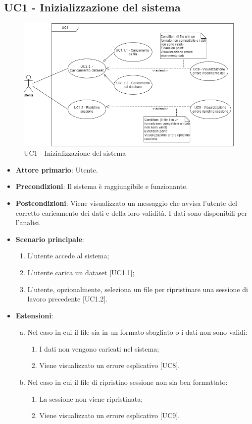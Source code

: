 \subsection{UC1 - Inizializzazione del sistema}
\begin{figure}[h]
\includegraphics[width=\linewidth]{section/Images/UC1.png}
\centering
\caption{UC1 - Inizializzazione del sistema}
\end{figure}
\begin{itemize}
	\item \textbf{Attore primario}: Utente.
	\item \textbf{Precondizioni}: Il sistema è raggiungibile e funzionante.
	\item \textbf{Postcondizioni}: Viene visualizzato un messaggio che avvisa l'utente del corretto caricamento dei dati e della loro validità. I dati sono disponibili per l'analisi.
	\item \textbf{Scenario principale}:
		\begin{enumerate}
			\item L'utente accede al sistema;
			\item L'utente carica un dataset [UC1.1];
			\item L'utente, opzionalmente, seleziona un file per ripristinare una sessione di lavoro precedente [UC1.2].
			
		\end{enumerate}
	\item \textbf{Estensioni}:
	\begin{enumerate}[(a)]
		\item Nel caso in cui il file sia in un formato sbagliato o i dati non sono validi:
		\begin{enumerate}[1.]
			\item I dati non vengono caricati nel sistema;
			\item Viene visualizzato un errore esplicativo [UC8].
		\end{enumerate}
		
		\item Nel caso in cui il file di ripristino sessione non sia ben formattato:
		\begin{enumerate}[1.]
			\item La sessione non viene ripristinata;
			\item Viene visualizzato un errore esplicativo [UC9].
		\end{enumerate}
	\end{enumerate}
\end{itemize}






  